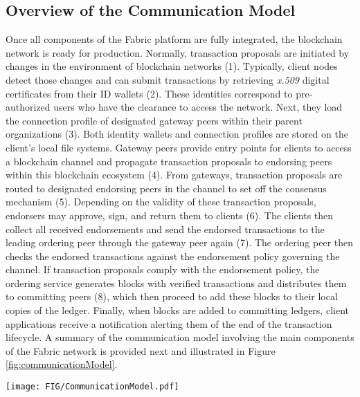 \documentclass[conference]{IEEEtran}
\begin{document}
\subsection{Overview of the Communication Model}
Once all components of the Fabric platform are fully integrated, the blockchain network is ready for production. Normally, transaction proposals are initiated by changes in the environment of blockchain networks (1). Typically, client nodes detect those changes and can submit transactions by retrieving \textit{x.509} digital certificates from their ID wallets (2). These identities correspond to pre-authorized users who have the clearance to access the network. Next, they load the connection profile of designated gateway peers within their parent organizations (3). Both identity wallets and connection profiles are stored on the client's local file systems. Gateway peers provide entry points for clients to access a blockchain channel and propagate transaction proposals to endorsing peers within this blockchain ecosystem (4). From gateways, transaction proposals are routed to designated endorsing peers in the channel to set off the consensus mechanism (5). Depending on the validity of these transaction proposals, endorsers may approve, sign, and return them to clients (6). The clients then collect all received endorsements and send the endorsed transactions to the leading ordering peer through the gateway peer again (7). The ordering peer then checks the endorsed transactions against the endorsement policy governing the channel. If transaction proposals comply with the endorsement policy, the ordering service generates blocks with verified transactions and distributes them to committing peers (8), which then proceed to add these blocks to their local copies of the ledger. Finally, when blocks are added to committing ledgers, client applications receive a notification alerting them of the end of the transaction lifecycle. A summary of the communication model involving the main components of the Fabric network is provided next and illustrated in Figure \ref{fig:communicationModel}.
%
\begin{figure*}[h]
    \centering
    \texttt{[image: FIG/CommunicationModel.pdf]}
    \caption{Fabric communication model}
    \label{fig:communicationModel}
\end{figure*}
%
%
\end{document}
